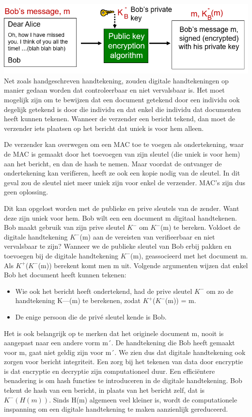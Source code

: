 \includegraphics[width=7in]{./img/imghfdst8/hfdst8puntje7.png}\\[1cm]

Net zoals handgeschreven handtekening, zouden digitale handtekeningen op manier gedaan worden dat controleerbaar en niet vervalsbaar is. Het moet mogelijk zijn om te bewijzen dat een document getekend door een individu ook degelijk getekend is door die individu en dat enkel die individu dat documenten heeft kunnen tekenen.
Wanneer de verzender een bericht tekend, dan moet de verzender iets plaatsen op het bericht dat uniek is voor hem alleen. 

De verzender kan overwegen om een MAC toe te voegen als ondertekening, waar de MAC is gemaakt door het toevoegen van zijn sleutel (die uniek is voor hem) aan het bericht, en dan de hash te nemen. Maar voordat de ontvanger de ondertekening kan verifïeren, heeft ze ook een kopie nodig van de sleutel. In dit geval zou de sleutel niet meer uniek zijn voor enkel de verzender. MAC’s zijn dus geen oplossing.

Dit kan opgelost worden met de publieke en prive sleutels van de zender. Want deze zijn uniek voor hem. Bob wilt een een document m digitaal handtekenen. Bob maakt gebruik van zijn prive sleutel $K^-$
om $K^-$(m) te bereken.
Voldoet de digitale handtekening $K^-$(m) aan de vereisten van verifieerbaar en niet vervalsbaar te zijn? Wanneer we de publieke sleutel van Bob erbij pakken en toevoegen bij de digitale handtekening $K^-$(m), geassocieerd met het document m. Als $K^+$($K^-$(m)) berekent komt men m uit. Volgende argumenten wijzen dat enkel Bob het document heeft kunnen tekenen:

\begin{itemize}
\item Wie ook het bericht heeft ondertekend, had de prive sleutel $K^-$ om zo de handtekening K—(m) te berekenen, zodat $K^+$($K^-$(m)) = m.
\item De enige persoon die de privé sleutel kende is Bob.
\end{itemize}
Het is ook belangrijk op te merken dat het originele document m, nooit is aangepast naar een andere vorm m´. De handtekening die Bob heeft gemaakt voor m, gaat niet geldig zijn voor m´. We zien dus dat digitale handtekening ook zorgen voor bericht integriteit.
Een zorg bij het tekenen van data door encryptie is dat encryptie en decryptie zijn computationeel duur. Een efficiëntere benadering is om hash functies te introduceren in de digitale handtekening. Bob tekent de hash van een bericht, in plaats van het bericht zelf, dat is $K^{-}(H(m))$. Sinds H(m) algemeen veel kleiner is, wordt de computationele inspanning om een digitale handtekening te maken aanzienlijk gereduceerd.

